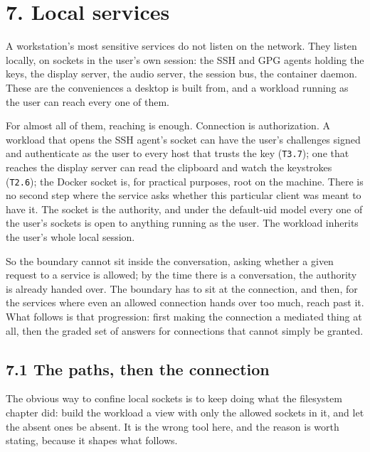 \hypertarget{local-services}{%
\chapter{7. Local services}\label{local-services}}

A workstation's most sensitive services do not listen on the network.
They listen locally, on sockets in the user's own session: the SSH and
GPG agents holding the keys, the display server, the audio server, the
session bus, the container daemon. These are the conveniences a desktop
is built from, and a workload running as the user can reach every one of
them.

For almost all of them, reaching is enough. Connection is authorization.
A workload that opens the SSH agent's socket can have the user's
challenges signed and authenticate as the user to every host that trusts
the key (\texttt{T3.7}); one that reaches the display server can read
the clipboard and watch the keystrokes (\texttt{T2.6}); the Docker
socket is, for practical purposes, root on the machine. There is no
second step where the service asks whether this particular client was
meant to have it. The socket is the authority, and under the default-uid
model every one of the user's sockets is open to anything running as the
user. The workload inherits the user's whole local session.

So the boundary cannot sit inside the conversation, asking whether a
given request to a service is allowed; by the time there is a
conversation, the authority is already handed over. The boundary has to
sit at the connection, and then, for the services where even an allowed
connection hands over too much, reach past it. What follows is that
progression: first making the connection a mediated thing at all, then
the graded set of answers for connections that cannot simply be granted.

\hypertarget{the-paths-then-the-connection}{%
\section{7.1 The paths, then the
connection}\label{the-paths-then-the-connection}}

The obvious way to confine local sockets is to keep doing what the
filesystem chapter did: build the workload a view with only the allowed
sockets in it, and let the absent ones be absent. It is the wrong tool
here, and the reason is worth stating, because it shapes what follows.

